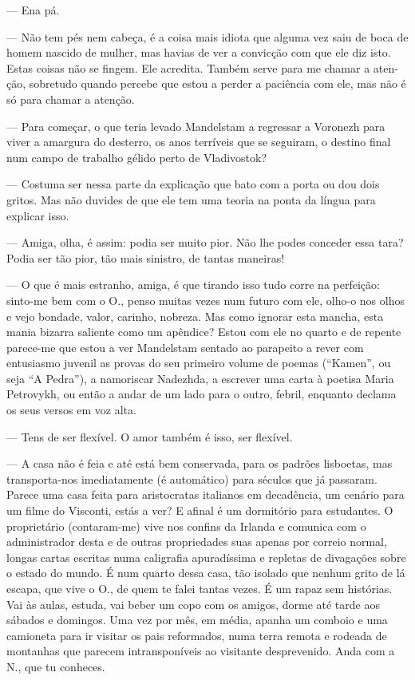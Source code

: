 --- Ena pá.

--- Não tem pés nem cabeça, é a coisa mais idiota que
alguma vez saiu de boca de homem nascido de mulher, mas havias de ver a
convicção com que ele diz isto. Estas coisas não se fingem. Ele
acredita. Também serve para me chamar a aten- ção, sobretudo quando
percebe que estou a perder a paciência com ele, mas não é só para chamar
a atenção.

--- Para começar, o que teria levado Mandelstam a regressar a Voronezh
  para viver a amargura do desterro, os anos terríveis que se
  seguiram, o destino final num campo de trabalho gélido perto de
  Vladivostok?

--- Costuma ser nessa parte da explicação que bato com a porta ou dou dois
  gritos. Mas não duvides de que ele tem uma teoria na ponta da língua
  para explicar isso.

--- Amiga, olha, é assim: podia ser muito pior. Não lhe podes conceder
  essa tara? Podia ser tão pior, tão mais sinistro, de tantas maneiras!

--- O que é mais estranho, amiga, é que tirando isso tudo corre na
  perfeição: sinto-me bem com o O., penso muitas vezes num futuro com
  ele, olho-o nos olhos e vejo bondade, valor, carinho, nobreza. Mas
  como ignorar esta mancha, esta mania bizarra saliente como um
  apêndice? Estou com ele no quarto e de repente parece-me que estou a
  ver Mandelstam sentado ao parapeito a rever com entusiasmo juvenil as
  provas do seu primeiro volume de poemas (``Kamen'', ou seja ``A
  Pedra''), a namoriscar Nadezhda, a escrever uma carta à poetisa
  Maria Petrovykh, ou então a andar de um lado para o outro, febril,
  enquanto declama os seus versos em voz alta.

--- Tens de ser flexível. O amor também é isso, ser flexível.


\medskip
\asterisc
\medskip

--- A casa não é feia e até está bem conservada, para os padrões
  lisboetas, mas transporta-nos imediatamente (é automático) para
  séculos que já passaram. Parece uma casa feita para aristocratas
  italianos em decadência, um cenário para um filme do Visconti, estás a
  ver? E afinal é um dormitório para estudantes. O proprietário
  (contaram-me) vive nos confins da Irlanda e comunica com o
  administrador desta e de outras propriedades suas apenas por correio
  normal, longas cartas escritas numa caligrafia apuradíssima e repletas
  de divagações sobre o estado do mundo. É num quarto dessa casa, tão
  isolado que nenhum grito de lá escapa, que vive o O., de quem te falei
  tantas vezes. É um rapaz sem histórias. Vai às aulas, estuda, vai
  beber um copo com os amigos, dorme até tarde aos sábados e domingos.
  Uma vez por mês, em média, apanha um comboio e uma camioneta para ir
  visitar os pais reformados, numa terra remota e rodeada de montanhas
  que parecem intransponíveis ao visitante desprevenido. Anda com a N.,
  que tu conheces.


